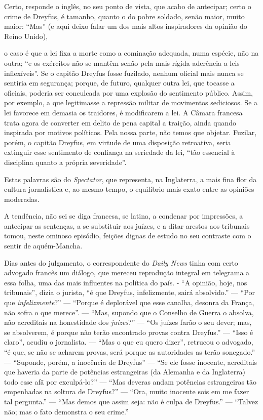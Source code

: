 Certo, responde o inglês, no seu ponto de vista, que acabo de antecipar;
certo o crime de Dreyfus, é tamanho, quanto o do pobre soldado, senão
maior, muito maior: ``Mas'' (e aqui deixo
falar um dos mais altos inspiradores da opinião do Reino Unido),

\begin{hedraquote}
o caso é que a lei fixa a morte como a cominação adequada, numa espécie,
não na outra; ``e os exércitos não se mantêm senão pela
mais rígida aderência a leis inflexíveis''. Se o capitão
Dreyfus fosse fuzilado, nenhum oficial mais nunca se sentiria em
segurança; porque, de futuro, qualquer outra lei, que tocasse a
oficiais, poderia ser conculcada por uma explosão do sentimento
público. Assim, por exemplo, a que legitimasse a repressão militar de
movimentos sediciosos. Se a lei favorece em demasia os traidores, é
modificarem a lei. A Câmara francesa trata agora de converter em delito
de pena capital a traição, ainda quando inspirada por motivos
políticos. Pela nossa parte, não temos que objetar. Fuzilar, porém, o
capitão Dreyfus, em virtude de uma disposição retroativa, seria
extinguir esse sentimento de confiança na seriedade da lei,
``tão essencial à disciplina quanto a própria severidade''.
\end{hedraquote}

Estas palavras são do \textit{Spectator}, que representa, na Inglaterra, a mais
fina flor da cultura jornalística e, ao mesmo tempo, o equilíbrio mais
exato entre as opiniões moderadas.

A tendência, não sei se diga francesa, se latina, a condenar por
impressões, a antecipar as sentenças, a se substituir aos juízes, e a
ditar arestos aos tribunais tomou, neste ominoso episódio, feições
dignas de estudo no seu contraste com o sentir de aquém-Mancha.

Dias antes do julgamento, o correspondente do \textit{Daily News} tinha com certo
advogado francês um diálogo, que mereceu reprodução integral em
telegrama a essa folha, uma das mais influentes na política do país.
- ``A opinião, hoje, nos tribunais'', dizia
o jurista, ``é que Dreyfus, infelizmente, sairá
absolvido.'' --- ``Por que
\textit{infelizmente}?'' --- ``Porque é deplorável que
esse canalha, desonra da França, não sofra o que merece''. --- 
``Mas, supondo que o Conselho de Guerra o absolva, não
acreditais na honestidade dos \textit{juízes}?'' --- ``Os juízes 
farão o seu dever; mas, se absolverem, é
porque não terão encontrado provas contra Dreyfus.'' --- ``Isso é 
claro'', acudiu o jornalista. --- ``Mas o que eu quero dizer'', retrucou o
advogado, ``é que, se não se acharem provas, será porque
as autoridades as terão sonegado.'' --- ``Suponde, porém, a inocência de Dreyfus''
--- ``Se ele fosse inocente, acreditais que haveria da
parte de potências estrangeiras (da Alemanha e da Inglaterra) todo esse
afã por exculpá-lo?'' --- ``Mas deveras
andam potências estrangeiras tão empenhadas na soltura de
Dreyfus?'' --- ``Ora, muito inocente sois em
me fazer tal pergunta.'' --- ``Mas demos que
assim seja: não é culpa de Dreyfus.'' ---
``Talvez não; mas o fato demonstra o seu crime.''

